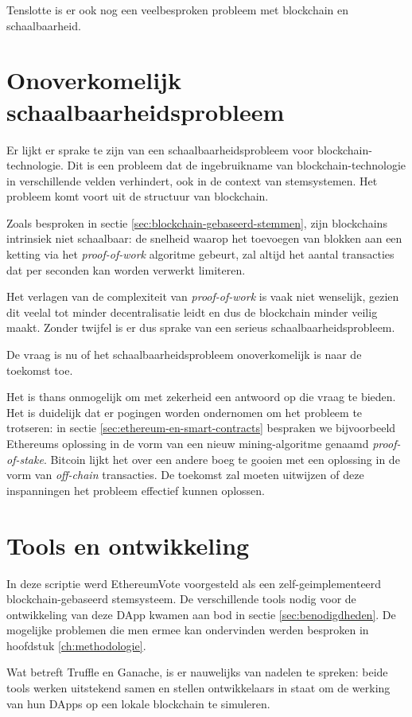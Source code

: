 Tenslotte is er ook nog een veelbesproken probleem met blockchain en schaalbaarheid.
\section{Onoverkomelijk schaalbaarheidsprobleem}
 Er lijkt er sprake te zijn van een schaalbaarheidsprobleem voor blockchain-technologie. Dit is een probleem dat de ingebruikname van blockchain-technologie in verschillende velden verhindert, ook in de context van stemsystemen. Het probleem komt voort uit de structuur van blockchain. 
 
 Zoals besproken in sectie \ref{sec:blockchain-gebaseerd-stemmen}, zijn blockchains intrinsiek niet schaalbaar: de snelheid waarop het toevoegen van blokken aan een ketting via het \textit{proof-of-work} algoritme gebeurt, zal altijd het aantal transacties dat per seconden kan worden verwerkt limiteren. 
 
Het verlagen van de complexiteit van \textit{proof-of-work} is vaak niet wenselijk, gezien dit veelal tot minder decentralisatie leidt en dus de blockchain minder veilig maakt. Zonder twijfel is er dus sprake van een serieus schaalbaarheidsprobleem.
	
De vraag is nu of het schaalbaarheidsprobleem onoverkomelijk is naar de toekomst toe. 
	
Het is thans onmogelijk om met zekerheid een antwoord op die vraag te bieden. Het is duidelijk dat er pogingen worden ondernomen om het probleem te trotseren: in sectie \ref{sec:ethereum-en-smart-contracts} bespraken we bijvoorbeeld Ethereums oplossing in de vorm van een nieuw mining-algoritme genaamd \textit{proof-of-stake}. Bitcoin lijkt het over een andere boeg te gooien met een oplossing in de vorm van \textit{off-chain} transacties. De toekomst zal moeten uitwijzen of deze inspanningen het probleem effectief kunnen oplossen.
\section{Tools en ontwikkeling}
	
In deze scriptie werd EthereumVote voorgesteld als een zelf-geimplementeerd blockchain-gebaseerd stemsysteem. De verschillende tools nodig voor de ontwikkeling van deze DApp kwamen aan bod in sectie \ref{sec:benodigdheden}. De mogelijke problemen die men ermee kan ondervinden werden besproken in hoofdstuk \ref{ch:methodologie}.
	 
Wat betreft Truffle en Ganache, is er nauwelijks van nadelen te spreken: beide tools werken uitstekend samen en stellen ontwikkelaars in staat om de werking van hun DApps op een lokale blockchain te simuleren. 

